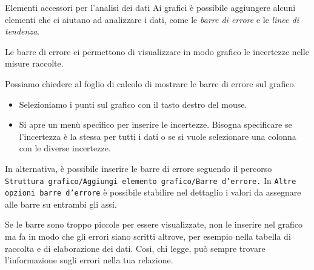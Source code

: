 \documentclass[12pt,a4paper,oneside]{book}
\makeatletter
\renewcommand{\subsection}{\@startsection {subsection}{2}{\z@}
{-3ex \@plus -0.1ex \@minus -.4ex}
{0.5ex \@plus.2ex }
{\color[rgb]{0.141,0.596,0.749}\normalfont\sffamily\bfseries}}
\theoremstyle{esercizio}
\makeatother
\begin{document}
\subsection{Elementi accessori per l'analisi dei dati}
Ai grafici è possibile aggiungere alcuni elementi che ci aiutano ad 
analizzare i dati, come le \textit{barre di errore} e le \textit{linee di tendenza}. 

\begin{definizione}
    Le barre di errore ci permettono di visualizzare in modo grafico le incertezze nelle
    misure raccolte.
\end{definizione}
Possiamo chiedere al foglio di calcolo di mostrare le barre di errore  sul grafico.

\begin{itemize}
    \item Selezioniamo i punti sul grafico con il tasto destro del mouse.
    \item Si apre un menù specifico per inserire le incertezze. Bisogna specificare
    se l'incertezza è la stessa per tutti i dati o se si vuole selezionare 
    una colonna con le diverse incertezze. 
\end{itemize}
In alternativa, è possibile inserire le barre di errore seguendo il percorso
\texttt{Struttura grafico/Aggiungi elemento  grafico/Barre d'errore.} In 
\texttt{Altre opzioni barre d'errore} è possibile stabilire nel dettaglio 
i valori da assegnare alle barre su entrambi gli assi.
\begin{remark}
    Se le barre sono troppo piccole per essere visualizzate, non le inserire
    nel grafico ma fa in modo che gli errori siano scritti altrove, per esempio nella
    tabella di raccolta e di elaborazione dei dati. Così, chi legge, può sempre
    trovare l'informazione sugli errori nella tua relazione.
\end{remark}
\end{document}
